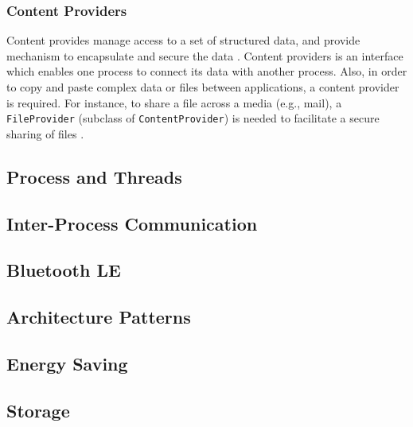 \subsubsection{Content Providers}
Content provides manage access to a set of structured data, and provide mechanism to encapsulate and secure the data \cite{contentproviders}. Content providers is an interface which enables one process to connect its data with another process. Also, in order to copy and paste complex data or files between applications, a content provider is required. For instance, to share a file across a media (e.g., mail), a \verb|FileProvider| (subclass of \verb|ContentProvider|) is needed to facilitate a secure sharing of files \cite{fileprovider}.


\subsection{Process and Threads}

\subsection{Inter-Process Communication}

\subsection{Bluetooth LE}

\subsection{Architecture Patterns}

\subsection{Energy Saving}

\subsection{Storage}